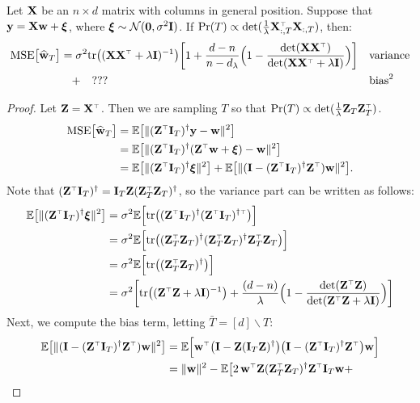 \documentclass[12pt]{sty/colt2019/colt2018-arxiv}
\begin{document}
\begin{theorem}\label{t:mse-dual}
  Let $\mathbf X$ be an $n\times d$ matrix with columns in general
  position. Suppose that $\mathbf y=\mathbf X\mathbf w+\boldsymbol\xi$, where
  $\boldsymbol\xi\sim\mathcal{N}(\mathbf 0,\sigma^2\mathbf I)$. If $\Pr(T)\propto
  \det(\frac1\lambda\X_{:,T}^\top\X_{:,T})$, then:
  \begin{align*}
    \MSE{\wbh_T} &=
    \sigma^2\tr\big((\X\X^\top+\lambda\I)^{-1}\big)\bigg[1 +
    \frac{d-n}{n-d_\lambda}\Big(1-\frac{\det(\X\X^\top)}{\det(\X\X^\top+\lambda\I)}\Big)\bigg] &&\textnormal{variance}\\
    &\quad+\quad ???&&\textnormal{bias}^2
  \end{align*}
\end{theorem}
\begin{proof}
Let $\Z = \X^\top$. Then we are sampling $T$ so that $\Pr(T)\propto\det(\frac1\lambda\Z_T\Z_T^\top)$.
\begin{align*}
  \MSE{\wbh_T} &= \E\big[\|(\Z^\top\I_T)^\dagger\y - \w\|^2\big]\\
               &= \E\big[\|(\Z^\top\I_T)^\dagger(\Z^\top\w+\xib)-\w\|^2\big]\\
               &= \E\big[\|(\Z^\top\I_T)^\dagger\xib\|^2\big] +
                 \E\big[\|(\I-(\Z^\top\I_T)^\dagger\Z^\top)\w\|^2\big].
\end{align*}
Note that $(\Z^\top\I_T)^\dagger = \I_T\Z(\Z_T^\top\Z_T)^\dagger$, so the variance part can be written as follows:
\begin{align*}
  \E\big[\|(\Z^\top\I_T)^\dagger\xib\|^2\big]
  &= \sigma^2\E\Big[\tr\big((\Z^\top\I_T)^\dagger (\Z^\top\I_T)^{\dagger\top}\big)\Big]\\
  &=
    \sigma^2\E\Big[\tr\big((\Z_T^\top\Z_T)^\dagger(\Z_T^\top\Z_T)^\dagger\Z_T^\top\Z_T\big)\Big]\\
  &=\sigma^2\E\Big[\tr\big((\Z_T^\top\Z_T)^\dagger\big)\Big]\\
  &=\sigma^2\bigg[\tr\big((\Z^\top\Z+\lambda\I)^{-1}\big) +
    \frac{(d-n)}{\lambda}\Big(1-\frac{\det(\Z^\top\Z)}{\det(\Z^\top\Z+\lambda\I)}\Big)\bigg]
\end{align*}
Next, we compute the bias term, letting $\bar T = [d]\backslash T$:
\begin{align*}
  \E\big[\|(\I-(\Z^\top\I_T)^\dagger\Z^\top)\w\|^2\big]
  &= \E\Big[\w^\top\big(\I - \Z(\I_T\Z)^\dagger\big)\big(\I-(\Z^\top\I_T)^\dagger\Z^\top\big)\w\Big]\\
  &= \|\w\|^2 - \E\big[2\,\w^\top\Z(\Z_T^\top\Z_T)^\dagger\Z^\top\I_T\w +

\end{align*}
\end{proof}
\end{document}
